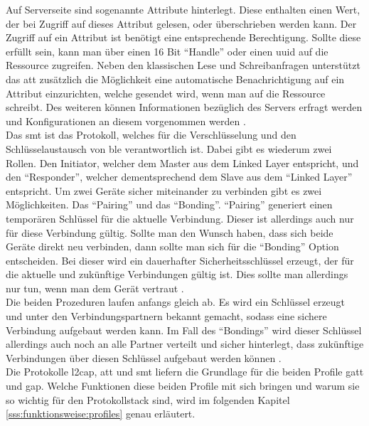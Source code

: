 \noindent Auf Serverseite sind sogenannte Attribute hinterlegt. Diese enthalten einen Wert, der bei Zugriff auf dieses Attribut gelesen, oder überschrieben werden kann. Der Zugriff auf ein Attribut ist benötigt eine entsprechende Berechtigung. Sollte diese erfüllt sein, kann man über einen 16 Bit "`Handle"' oder einen \ac{uuid} auf die Ressource zugreifen. Neben den klassischen Lese und Schreibanfragen unterstützt das \ac{att} zusätzlich die Möglichkeit eine automatische Benachrichtigung auf ein Attribut einzurichten, welche gesendet wird, wenn man auf die Ressource schreibt. Des weiteren können Informationen bezüglich des Servers erfragt werden und Konfigurationen an diesem vorgenommen werden \cite[Seite 26ff]{Townsend14:GSB}.\\

\noindent Das \ac{smt} ist das Protokoll, welches für die Verschlüsselung und den Schlüsselaustausch von \ac{ble} verantwortlich ist. Dabei gibt es wiederum zwei Rollen. Den Initiator, welcher dem Master aus dem Linked Layer entspricht, und den "`Responder"', welcher dementsprechend dem Slave aus dem "`Linked Layer"' entspricht. Um zwei Geräte sicher miteinander zu verbinden gibt es zwei Möglichkeiten. Das "`Pairing"' und das "`Bonding"'. "`Pairing"' generiert einen temporären Schlüssel für die aktuelle Verbindung. Dieser ist allerdings auch nur für diese Verbindung gültig. Sollte man den Wunsch haben, dass sich beide Geräte direkt neu verbinden, dann sollte man sich für die "`Bonding"' Option entscheiden. Bei dieser wird ein dauerhafter Sicherheitsschlüssel erzeugt, der für die aktuelle und zukünftige Verbindungen gültig ist. Dies sollte man allerdings nur tun, wenn man dem Gerät vertraut \cite[Seite 28]{Townsend14:GSB}.\\

\noindent Die beiden Prozeduren laufen anfangs gleich ab. Es wird ein Schlüssel erzeugt und unter den Verbindungspartnern bekannt gemacht, sodass eine sichere Verbindung aufgebaut werden kann. Im Fall des "`Bondings"' wird dieser Schlüssel allerdings auch noch an alle Partner verteilt und sicher hinterlegt, dass zukünftige Verbindungen über diesen Schlüssel aufgebaut werden können \cite[Seite 29]{Townsend14:GSB}.\\ 

\noindent Die Protokolle \ac{l2cap}, \ac{att} und \ac{smt} liefern die Grundlage für die beiden Profile \ac{gatt} und \ac{gap}. Welche Funktionen diese beiden Profile mit sich bringen und warum sie so wichtig für den Protokollstack sind, wird im folgenden Kapitel \ref{sss:funktionsweise:profiles} genau erläutert.\\

